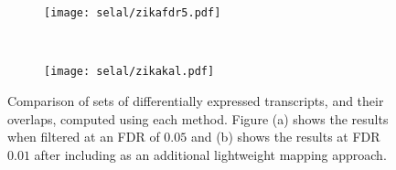 \begin{figure}[ht!]
    \centering
    \begin{subfigure}[t]{0.49\textwidth}
        \centering
  	  	\texttt{[image: selal/zikafdr5.pdf]}
		\caption{}
    \end{subfigure}
    ~ 
    \begin{subfigure}[t]{0.49\textwidth}
        \centering
  	  	\texttt{[image: selal/zikakal.pdf]}
		\caption{}
    \end{subfigure}
    \caption{Comparison of sets of differentially expressed transcripts, and their overlaps, computed using each method.
    Figure (a) shows the results when filtered at an FDR of $0.05$ and (b) shows the results at FDR $0.01$ after including \kallisto as 
    an additional lightweight mapping approach.}
    \label{fig:suppdte}
\end{figure}